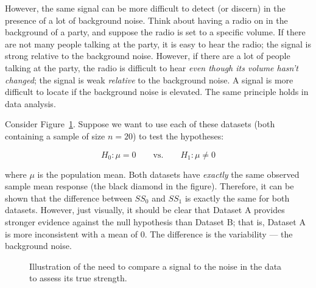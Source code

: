 \documentclass[
  letterpaper,
  DIV=11,
  numbers=noendperiod]{scrreprt}
\theoremstyle{plain}
\theoremstyle{definition}
\theoremstyle{definition}
\theoremstyle{remark}
\begin{document}
However, the same signal can be more difficult to detect (or discern) in
the presence of a lot of background noise. Think about having a radio on
in the background of a party, and suppose the radio is set to a specific
volume. If there are not many people talking at the party, it is easy to
hear the radio; the signal is strong relative to the background noise.
However, if there are a lot of people talking at the party, the radio is
difficult to hear \emph{even though its volume hasn't changed}; the
signal is weak \emph{relative} to the background noise. A signal is more
difficult to locate if the background noise is elevated. The same
principle holds in data analysis.

Consider Figure~\ref{fig-teststat-signal-to-noise}. Suppose we want to
use each of these datasets (both containing a sample of size \(n = 20\))
to test the hypotheses:

\[H_0: \mu = 0 \qquad \text{vs.} \qquad H_1: \mu \neq 0\]

where \(\mu\) is the population mean. Both datasets have \emph{exactly}
the same observed sample mean response (the black diamond in the
figure). Therefore, it can be shown that the difference between \(SS_0\)
and \(SS_1\) is exactly the same for both datasets. However, just
visually, it should be clear that Dataset A provides stronger evidence
against the null hypothesis than Dataset B; that is, Dataset A is more
inconsistent with a mean of 0. The difference is the variability --- the
background noise.

\begin{figure}


\caption{\label{fig-teststat-signal-to-noise}Illustration of the need to
compare a signal to the noise in the data to assess its true strength.}

\end{figure}%
\end{document}
